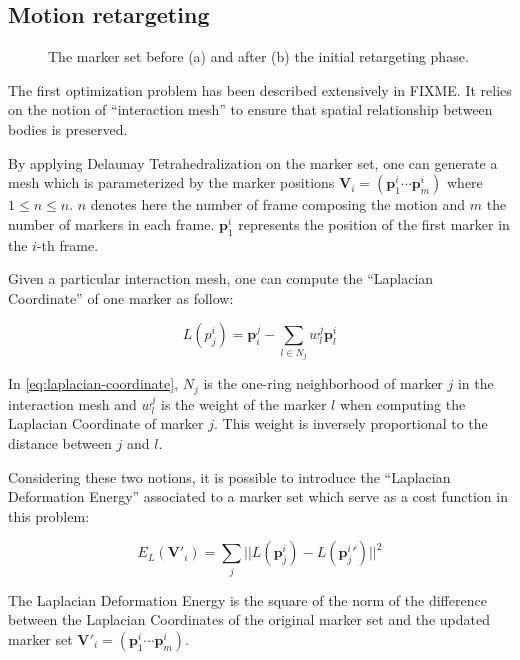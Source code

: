 \documentclass[letterpaper, 10 pt, conference]{ieeeconf}  %
\begin{document}
\subsection{Motion retargeting}


\begin{figure}[htbp!]
  \label{fig:retargeting}
  \caption{The marker set before (a) and after (b) the initial
    retargeting phase.}
\end{figure}


The first optimization problem has been described extensively in
FIXME. It relies on the notion of ``interaction mesh'' to ensure that
spatial relationship between bodies is preserved.

By applying Delaunay Tetrahedralization \cite{FIXME} on the marker
set, one can generate a mesh which is parameterized by the marker
positions $\mathbf{V}_i = (\mathbf{p}^i_1 \cdots \mathbf{p}^i_m)$
where $1 \leq n \leq n$. $n$ denotes here the number of frame
composing the motion and $m$ the number of markers in each
frame. $\mathbf{p}^i_1$ represents the position of the first marker in
the $i$-th frame.

Given a particular interaction mesh, one can compute the ``Laplacian
Coordinate'' of one marker as follow:

\begin{equation}\label{eq:laplacian-coordinate}
L(p^i_j) = \mathbf{p}_i^j - \sum_{l \in N_j} w^j_l \mathbf{p}^i_l
\end{equation}

In \autoref{eq:laplacian-coordinate}, $N_j$ is the one-ring
neighborhood of marker $j$ in the interaction mesh and $w^j_l$ is the
weight of the marker $l$ when computing the Laplacian Coordinate of
marker $j$. This weight is inversely proportional to the distance
between $j$ and $l$.

Considering these two notions, it is possible to introduce the
``Laplacian Deformation Energy'' associated to a marker set which
serve as a cost function in this problem:

\begin{equation}
E_L(\mathbf{V'}_i) = \sum_j || L(\mathbf{p}^i_j) - L(\mathbf{p}^i_j{}') ||^2
\end{equation}

The Laplacian Deformation Energy is the square of the norm of the
difference between the Laplacian Coordinates of the original marker
set and the updated marker set $\mathbf{V}'_i = (\mathbf{p}^i_1 \cdots
\mathbf{p}^i_m)$.
\end{document}
